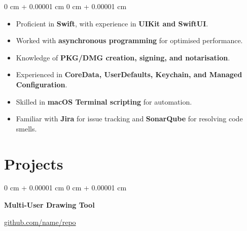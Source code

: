 \documentclass[10pt, letterpaper]{article}
\newenvironment{highlights}{
    \begin{itemize}[
        topsep=0.10 cm,
        parsep=0.10 cm,
        partopsep=0pt,
        itemsep=0pt,
        leftmargin=0 cm + 10pt
    ]
}{
    \end{itemize}
} %
\newenvironment{onecolentry}{
    \begin{adjustwidth}{
        0 cm + 0.00001 cm
    }{
        0 cm + 0.00001 cm
    }
}{
    \end{adjustwidth}
} %
\newenvironment{twocolentry}[2][]{
    \onecolentry
    \def\secondColumn{#2}
    \setcolumnwidth{\fill, 4.5 cm}
    \begin{paracol}{2}
}{
    \switchcolumn \raggedleft \secondColumn
    \end{paracol}
    \endonecolentry
} %
\begin{document}
        \vspace{0.10 cm}
        \begin{onecolentry}
            \begin{highlights}
                \item Proficient in \textbf{Swift}, with experience in \textbf{UIKit and SwiftUI}.
                \item Worked with \textbf{asynchronous programming} for optimised performance.
                \item Knowledge of \textbf{PKG/DMG creation, signing, and notarisation}.
                \item Experienced in \textbf{CoreData, UserDefaults, Keychain, and Managed Configuration}.
                \item Skilled in \textbf{macOS Terminal scripting} for automation.
                \item Familiar with \textbf{Jira} for issue tracking and \textbf{SonarQube} for resolving code smells.
            \end{highlights}
        \end{onecolentry}

        \vspace{0.2 cm}

    \section{Projects}



        
        \begin{twocolentry}{
            \href{https://github.com/sinaatalay/rendercv}{github.com/name/repo}
        }
            \textbf{Multi-User Drawing Tool}
        \end{twocolentry}
\end{document}
